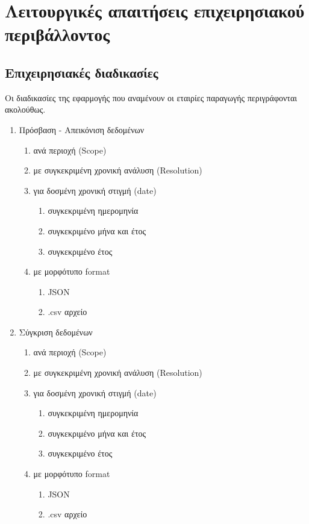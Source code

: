 \documentclass[a4paper,12pt, oneside]{article}
\begin{document}
\section{Λειτουργικές απαιτήσεις επιχειρησιακού περιβάλλοντος}
\subsection{Επιχειρησιακές διαδικασίες}
Οι διαδικασίες της εφαρμογής που αναμένουν οι εταιρίες παραγωγής περιγράφονται ακολούθως.
\renewcommand{\theenumi}{\Roman{enumi}}
\renewcommand{\theenumii}{\arabic{enumii}}
\renewcommand{\theenumiii}{\alph{enumiii}}

\begin{enumerate}
   \item Πρόσβαση - Απεικόνιση δεδομένων
      \begin{enumerate}
     \item ανά περιοχή \textlatin{(Scope)}
     \item με συγκεκριμένη χρονική ανάλυση \textlatin{(Resolution)}
     \item για δοσμένη χρονική στιγμή \textlatin{(date)}
     \begin{enumerate}
  	\item συγκεκριμένη ημερομηνία
   	\item συγκεκριμένο μήνα και έτος	   	
	\item συγκεκριμένο έτος
     \end{enumerate}
     \item με μορφότυπο \textlatin{format}
     \begin{enumerate}
  	\item \textlatin{JSON}
   	\item \textlatin{.csv} αρχείο
     \end{enumerate}
   \end{enumerate}
   \item Σύγκριση δεδομένων
       \begin{enumerate}
     \item ανά περιοχή \textlatin{(Scope)}
     \item με συγκεκριμένη χρονική ανάλυση \textlatin{(Resolution)}
     \item για δοσμένη χρονική στιγμή \textlatin{(date)}
     \begin{enumerate}
  	\item συγκεκριμένη ημερομηνία
   	\item συγκεκριμένο μήνα και έτος	   	
	\item συγκεκριμένο έτος
     \end{enumerate}
     \item με μορφότυπο \textlatin{format}
     \begin{enumerate}
  	\item \textlatin{JSON}
   	\item \textlatin{.csv} αρχείο
     \end{enumerate}
   \end{enumerate}


\end{enumerate}
\end{document}
